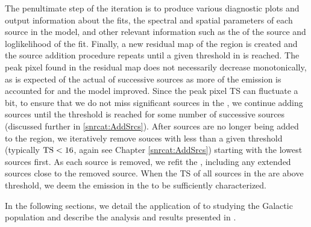 The penultimate step of the iteration is to produce various diagnostic plots and output information about the fits, the spectral and spatial parameters of each source in the model, and other relevant information such as the \ts{} of the source and loglikelihood of the fit. Finally, a new residual \ts{} map of the region is created and the source addition procedure repeats until a given threshold in \ts{} is reached. The peak pixel \ts{} found in the residual \ts{} map does not necessarily decrease monotonically, as is expected of the actual \ts{} of successive sources as more of the emission is accounted for and the model improved. Since the peak pixel TS can fluctuate a bit, to ensure that we do not miss significant sources in the \roi{}, we continue adding sources until the \ts{} threshold is reached for some number of successive sources (discussed further in \ref{snrcat:AddSrcs}). After sources are no longer being added to the region, we iteratively remove souces with \ts{} less than a given threshold (typically ${\rm TS < 16}$, again see Chapter \ref{snrcat:AddSrcs}) starting with the lowest \ts{} sources first. As each source is removed, we refit the \roi{}, including any extended sources close to the removed source. When the TS of all sources in the \roi{} are above threshold, we deem the emission in the \roi{} to be sufficiently characterized.

In the following sections, we detail the application of \srcs{} to studying the \gev{} Galactic \snr{} population and describe the analysis and results presented in \cite{snrCat}.




